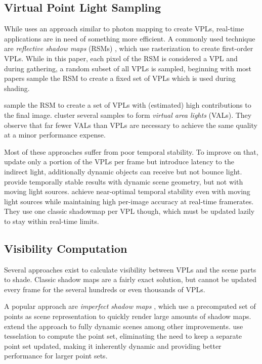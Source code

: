 \subsection{Virtual Point Light Sampling}

While \citet{Keller:1997:InstantRadiosity} uses an approach similar to photon mapping to create VPLs, real-time applications are in need of something more efficient. A commonly used technique are \emph{reflective shadow maps} (RSMs) \citep{Dachsbacher:2005:RSM}, which use rasterization to create first-order VPLs. While in this paper, each pixel of the RSM is considered a VPL and during gathering, a random subset of all VPLs is sampled, beginning with \citet{dachsbacher2006splatting} most papers sample the RSM to create a fixed set of VPLs which is used during shading.

\citet{georgiev2010simple, ritschel2011ismsViewAdaptive} sample the RSM to create a set of VPLs with (estimated) high contributions to the final image. \citet{dong2009real, prutkin2012reflective} cluster several samples to form \emph{virtual area lights} (VALs). They observe that far fewer VALs than VPLs are necessary to achieve the same quality at a minor performance expense.

Most of these approaches suffer from poor temporal stability. To improve on that, \citet{laine2007incremental} update only a portion of the VPLs per frame but introduce latency to the indirect light, additionally dynamic objects can receive but not bounce light. \citet{barak2013temporally} provide temporally stable results with dynamic scene geometry, but not with moving light sources. \citet{hedman2016sequential} achieve near-optimal temporal stability even with moving light sources while maintaining high per-image accuracy at real-time framerates. They use one classic shadowmap per VPL though, which must be updated lazily to stay within real-time limits.


\subsection{Visibility Computation}

Several approaches exist to calculate visibility between VPLs and the scene parts to shade. Classic shadow maps are a fairly exact solution, but cannot be updated every frame for the several hundreds or even thousands of VPLs.

A popular approach are \emph{imperfect shadow maps} \citep[ISMs,][]{ritschel2008ism}, which use a precomputed set of points as scene representation to quickly render large amounts of shadow maps. \citet{ritschel2011ismsViewAdaptive} extend the approach to fully dynamic scenes among other improvements. \citet{barak2013temporally} use tesselation to compute the point set, eliminating the need to keep a separate point set updated, making it inherently dynamic and providing better performance for larger point sets.

